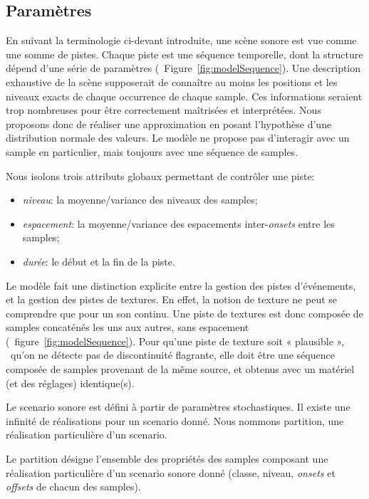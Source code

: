 \subsection{Paramètres}
\label{sec:ch4_modelParam}

En suivant la terminologie ci-devant introduite, une scène sonore est vue comme une somme de pistes. Chaque piste est une séquence temporelle, dont la structure dépend d'une série de paramètres (\cf~Figure~\ref{fig:modelSequence}). Une description exhaustive de la scène supposerait de connaître au moins les positions et les niveaux exacts de chaque occurrence de chaque sample. Ces informations seraient trop nombreuses pour être correctement maîtrisées et interprétées. Nous proposons donc de réaliser une approximation en posant l'hypothèse d'une distribution normale des valeurs. Le modèle ne propose pas d’interagir avec un sample en particulier, mais toujours avec une séquence de samples.

Nous isolons trois attributs globaux permettant de contrôler une piste:

\begin{itemize}
\item \emph{niveau}: la moyenne/variance des niveaux des samples;
\item \emph{espacement}: la moyenne/variance des espacements inter-\emph{onsets} entre les samples;
\item \emph{durée}: le début et la fin de la piste.
\end{itemize}

Le modèle fait une distinction explicite entre la gestion des pistes d'événements, et la gestion des pistes de textures. En effet, la notion de texture ne peut se comprendre que pour un son continu. Une piste de textures est donc composée de samples concaténés les uns aux autres, sans espacement (\cf~figure~\ref{fig:modelSequence}). Pour qu'une piste de texture soit « plausible », \ie~qu'on ne détecte pas de discontinuité flagrante, elle doit être une séquence composée de samples provenant de la même source, et obtenus avec un matériel (et des réglages) identique(s).

Le scenario sonore est défini à partir de paramètres stochastiques. Il existe une infinité de réalisations pour un scenario donné. Nous nommons partition, une réalisation particulière d'un scenario.

\begin{mydef}
Le partition désigne l'ensemble des propriétés des samples composant une réalisation particulière d'un scenario sonore donné (classe, niveau, \emph{onsets} et \emph{offsets} de chacun des samples).
\end{mydef}

